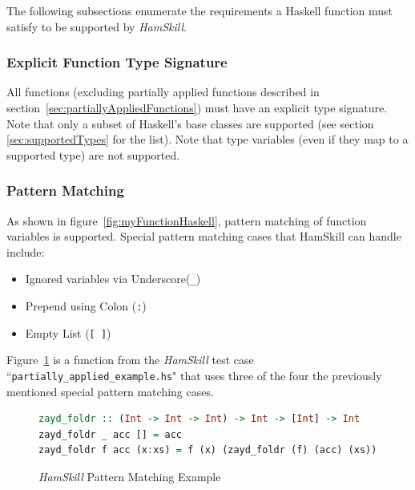 \documentclass{report}
\begin{document}
The following subsections enumerate the requirements a Haskell function must satisfy to be supported by \textit{HamSkill}.

\subsubsection{Explicit Function Type Signature}\label{sec:explicitTypeSignature}

All functions (excluding partially applied functions described in section~\ref{sec:partiallyAppliedFunctions}) must have an explicit type signature.  Note that only a subset of Haskell's base classes are supported (see section \ref{sec:supportedTypes} for the list).  Note that type variables (even if they map to a supported type) are not supported.

\subsubsection{Pattern Matching}\label{sec:supportedPatternMatching}

As shown in figure~\ref{fig:myFunctionHaskell}, pattern matching of function variables is supported.  Special pattern matching cases that HamSkill can handle include:

\begin{itemize}

\item Ignored variables via Underscore(\texttt{\_})

\item Prepend using Colon (\texttt{:})

\item Empty List (\texttt{[ ]})

\end{itemize}

Figure~\ref{fig:functionZaydFoldr} is a function from the \textit{HamSkill} test case ``\texttt{partially\_applied\_example.hs}" that uses three of the four the previously mentioned special pattern matching cases.

\begin{figure}[H]
\begin{mdframed}
\begin{lstlisting}[basicstyle=\small, language=Haskell]
zayd_foldr :: (Int -> Int -> Int) -> Int -> [Int] -> Int
zayd_foldr _ acc [] = acc
zayd_foldr f acc (x:xs) = f (x) (zayd_foldr (f) (acc) (xs))
\end{lstlisting}
\end{mdframed}
\caption{\textit{HamSkill} Pattern Matching Example}\label{fig:functionZaydFoldr}
\end{figure}
\end{document}
